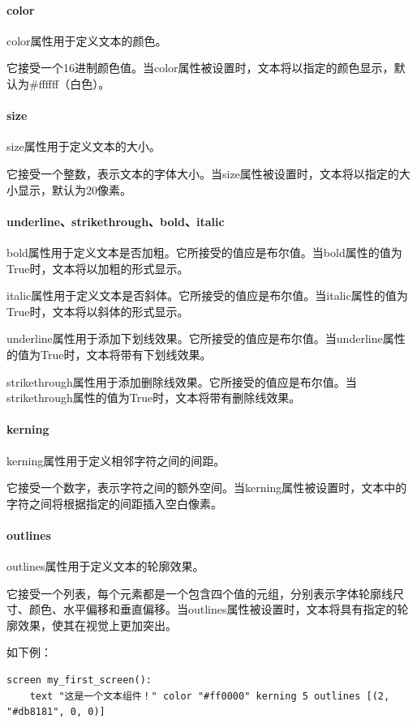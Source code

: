 \documentclass[../../Main.tex]{subfiles}
\begin{document}
\paragraph{color}
color属性用于定义文本的颜色。

它接受一个16进制颜色值。当color属性被设置时，文本将以指定的颜色显示，默认为\#ffffff（白色）。

\paragraph{size}
size属性用于定义文本的大小。

它接受一个整数，表示文本的字体大小。当size属性被设置时，文本将以指定的大小显示，默认为20像素。

\paragraph{underline、strikethrough、bold、italic}

bold属性用于定义文本是否加粗。它所接受的值应是布尔值。当bold属性的值为True时，文本将以加粗的形式显示。

italic属性用于定义文本是否斜体。它所接受的值应是布尔值。当italic属性的值为True时，文本将以斜体的形式显示。

underline属性用于添加下划线效果。它所接受的值应是布尔值。当underline属性的值为True时，文本将带有下划线效果。

strikethrough属性用于添加删除线效果。它所接受的值应是布尔值。当strikethrough属性的值为True时，文本将带有删除线效果。

\paragraph{kerning}
kerning属性用于定义相邻字符之间的间距。

它接受一个数字，表示字符之间的额外空间。当kerning属性被设置时，文本中的字符之间将根据指定的间距插入空白像素。

\paragraph{outlines}
outlines属性用于定义文本的轮廓效果。

它接受一个列表，每个元素都是一个包含四个值的元组，分别表示字体轮廓线尺寸、颜色、水平偏移和垂直偏移。当outlines属性被设置时，文本将具有指定的轮廓效果，使其在视觉上更加突出。

如下例：

\begin{lstlisting}
screen my_first_screen():
    text "这是一个文本组件！" color "#ff0000" kerning 5 outlines [(2, "#db8181", 0, 0)]
\end{lstlisting}
\end{document}
